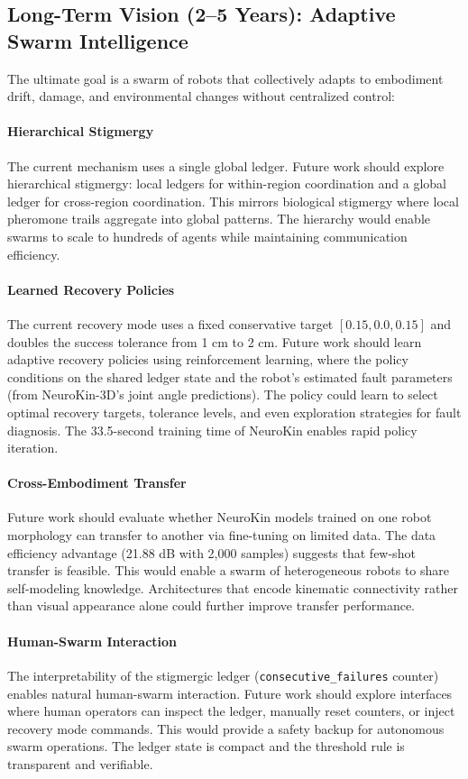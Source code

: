﻿\documentclass[12pt,a4paper,oneside]{report}
\begin{document}
\subsection{Long-Term Vision (2--5 Years): Adaptive Swarm Intelligence}

The ultimate goal is a swarm of robots that collectively adapts to embodiment drift, damage, and environmental changes without centralized control:

\paragraph{Hierarchical Stigmergy}
The current mechanism uses a single global ledger. Future work should explore hierarchical stigmergy: local ledgers for within-region coordination and a global ledger for cross-region coordination. This mirrors biological stigmergy where local pheromone trails aggregate into global patterns. The hierarchy would enable swarms to scale to hundreds of agents while maintaining communication efficiency.

\paragraph{Learned Recovery Policies}
The current recovery mode uses a fixed conservative target $[0.15, 0.0, 0.15]$ and doubles the success tolerance from 1 cm to 2 cm. Future work should learn adaptive recovery policies using reinforcement learning, where the policy conditions on the shared ledger state and the robot's estimated fault parameters (from NeuroKin-3D's joint angle predictions). The policy could learn to select optimal recovery targets, tolerance levels, and even exploration strategies for fault diagnosis. The 33.5-second training time of NeuroKin enables rapid policy iteration.

\paragraph{Cross-Embodiment Transfer}
Future work should evaluate whether NeuroKin models trained on one robot morphology can transfer to another via fine-tuning on limited data. The data efficiency advantage (21.88 dB with 2,000 samples) suggests that few-shot transfer is feasible. This would enable a swarm of heterogeneous robots to share self-modeling knowledge. Architectures that encode kinematic connectivity rather than visual appearance alone could further improve transfer performance.

\paragraph{Human-Swarm Interaction}
The interpretability of the stigmergic ledger (\texttt{consecutive\_failures} counter) enables natural human-swarm interaction. Future work should explore interfaces where human operators can inspect the ledger, manually reset counters, or inject recovery mode commands. This would provide a safety backup for autonomous swarm operations. The ledger state is compact and the threshold rule is transparent and verifiable.
\end{document}
